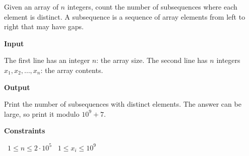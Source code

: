 Given an array of $n$ integers, count the number of subsequences where each element is distinct.
A subsequence is a sequence of array elements from left to right that may have gaps.

\vspace{0.3cm}\noindent\textbf{Input}

The first line has an integer $n$: the array size.
The second line has $n$ integers $x_1,x_2,\dots,x_n$: the array contents.

\vspace{0.3cm}\noindent\textbf{Output}

Print the number of subsequences with distinct elements. The answer can be large, so print it modulo $10^9+7$.

\vspace{0.3cm}\noindent\textbf{Constraints}

\textbullet\ $1 \le n \le 2 \cdot 10^5$
\textbullet\ $1 \le x_i \le 10^9$
